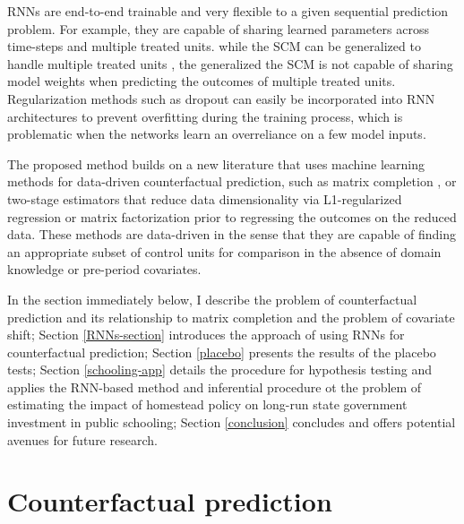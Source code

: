 \documentclass[hidelinks,12pt]{article}
\begin{document}
RNNs are end-to-end trainable and very flexible to a given sequential prediction problem. For example, they are capable of sharing learned parameters across time-steps and multiple treated units. while the SCM can be generalized to handle multiple treated units \citep[e.g.,][]{dube2015pooling,xu2017generalized}, the generalized the SCM is not capable of sharing model weights when predicting the outcomes of multiple treated units. Regularization methods such as dropout can easily be incorporated into RNN architectures to prevent overfitting during the training process, which is problematic when the networks learn an overreliance on a few model inputs.

The proposed method builds on a new literature that uses machine learning methods for data-driven counterfactual prediction, such as matrix completion \citep{athey2017matrix,2019arXiv190308028P}, or two-stage estimators that reduce data dimensionality via L1-regularized regression \citep{doudchenko2016balancing,carvalho2018arco} or matrix factorization \citep{amjad2018robust} prior to regressing the outcomes on the reduced data. These methods are data-driven in the sense that they are capable of finding an appropriate subset of control units for comparison in the absence of domain knowledge or pre-period covariates. 

In the section immediately below, I describe the problem of counterfactual prediction and its relationship to matrix completion and the problem of covariate shift; Section \ref{RNNs-section} introduces the approach of using RNNs for counterfactual prediction; Section \ref{placebo} presents the results of the placebo tests; Section \ref{schooling-app} details the procedure for hypothesis testing and applies the RNN-based method and inferential procedure ot the problem of estimating the impact of homestead policy on long-run state government investment in public schooling; Section \ref{conclusion} concludes and offers potential avenues for future research. 

\section{Counterfactual prediction} \label{prediction}
\end{document}
